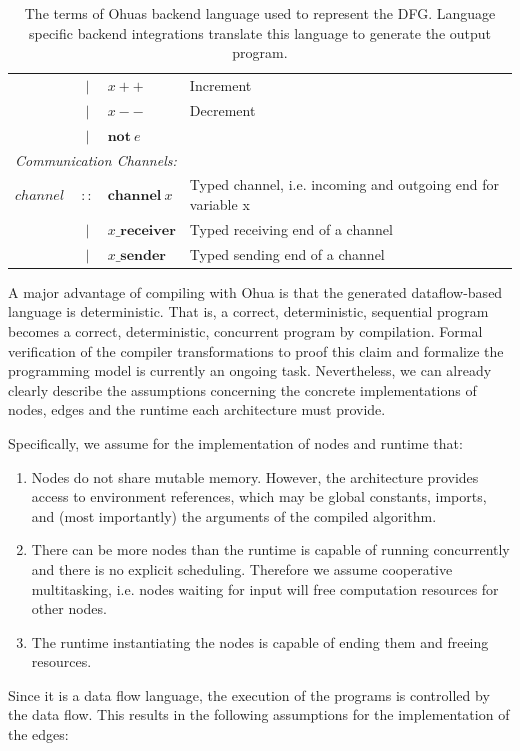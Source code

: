 \begin{table}[ht]
{\begin{tabular}{l c l l}
        & $|$ & $ x++$ & Increment \\
        & $|$ & $ x--$ & Decrement \\
        & $|$ & $ \textbf{not}\ e$ & \\
        \multicolumn{4}{l}{\emph{Communication Channels:}}\\
        $channel\ $& $::$ &$\textbf{channel}\ x$& Typed channel, i.e. incoming and outgoing end for variable x\\
        & $|$ &$x\textbf{\_receiver}$& Typed receiving end of a  channel  \\
        & $|$ &$x\textbf{\_sender}$ &Typed sending end of a channel  \\
    \end{tabular}%
    }
    \caption{The terms of Ohuas backend language used to represent the DFG. Language specific backend integrations translate this language to generate the output program.}
    \label{tab:DFGdef}
\end{table}

A major advantage of compiling with Ohua is that the generated dataflow-based language is deterministic. That is, a correct, deterministic, sequential program becomes a correct, deterministic, concurrent program by compilation. Formal verification of the compiler transformations to proof this claim and formalize the programming model is currently an ongoing task. Nevertheless, we can already clearly describe the assumptions concerning the concrete implementations of nodes, edges and the runtime each architecture must provide.

Specifically, we assume for the implementation of nodes and runtime that:
\begin{enumerate}
    \item Nodes do not share mutable memory. However, the architecture provides access to environment references, which may be global constants, imports, and (most importantly) the arguments of the compiled algorithm.
    \item There can be more nodes than the runtime is capable of running concurrently and there is no explicit scheduling. Therefore we assume cooperative multitasking, i.e. nodes waiting for input will free computation resources for other nodes.
    \item The runtime instantiating the nodes is capable of ending them and freeing resources.
\end{enumerate}

Since it is a data flow language, the execution of the programs is controlled by the data flow. This results in the following assumptions for the implementation of the edges: 

